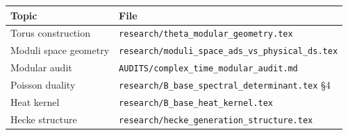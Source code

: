 \documentclass[11pt,a4paper]{article}
\begin{document}
\begin{tabular}{ll}
\hline
Topic & File \\
\hline
Torus construction & \texttt{research/theta\_modular\_geometry.tex} \\
Moduli space geometry & \texttt{research/moduli\_space\_ads\_vs\_physical\_ds.tex} \\
Modular audit & \texttt{AUDITS/complex\_time\_modular\_audit.md} \\
Poisson duality & \texttt{research/B\_base\_spectral\_determinant.tex} §4 \\
Heat kernel & \texttt{research/B\_base\_heat\_kernel.tex} \\
Hecke structure & \texttt{research/hecke\_generation\_structure.tex} \\
\hline
\end{tabular}
\end{document}
